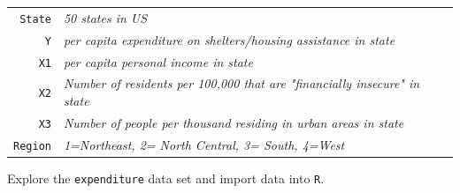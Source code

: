 \documentclass[12pt,letterpaper]{article}
\begin{document}
\begin{tabular}{r|l}
    \texttt{State} &\emph{50 states in US} \\
    \texttt{Y} & \emph{per capita expenditure on shelters/housing assistance in state}\\
    \texttt{X1} &\emph{per capita personal income in state} \\
	\texttt{X2} &  \emph{Number of residents per 100,000 that are "financially insecure" in state}\\
	\texttt{X3} &  \emph{Number of people per thousand residing in urban areas in state} \\
	\texttt{Region} &  \emph{1=Northeast, 2= North Central, 3= South, 4=West} \\
\end{tabular}

\vspace{.5cm}
\noindent Explore the \texttt{expenditure} data set and import data into \texttt{R}.

\vspace{.5cm}
  
\end{document}
